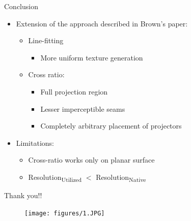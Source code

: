 \documentclass{beamer}
\begin{document}
\begin{frame}{Conclusion}

\begin{itemize}
\item Extension of the approach described in Brown's paper:
\begin{itemize}
\item Line-fitting 
\begin{itemize}
\item More uniform texture generation
\end{itemize}
\item Cross ratio:
\begin{itemize}
\item Full projection region 
\item Lesser imperceptible seams
\item Completely arbitrary placement of projectors
\end{itemize}
\end{itemize}

\item Limitations:
\begin{itemize}
\item Cross-ratio works only on planar surface
\item \texorpdfstring{Resolution\textsubscript{Utilized}}{Resolution Utilized} $<$ \texorpdfstring{Resolution\textsubscript{Native}}{Resolution Native}
\end{itemize}
\end{itemize}

\end{frame}
\begin{frame}{Thank you!!}
\begin{figure}
\texttt{[image: figures/1.JPG]}
\end{figure}
\end{frame}

\end{document}
